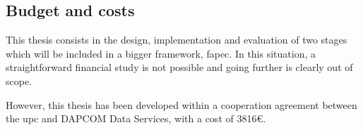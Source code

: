 \subsection{Budget and costs}
This thesis consists in the design, implementation and evaluation of two stages which will be included in a bigger framework, \acrshort{fapec}. In this situation, a straightforward financial study is not possible and going further is clearly out of scope.

However, this thesis has been developed within a cooperation agreement between the \acrfull{upc} and DAPCOM Data Services, with a cost of 3816€.
